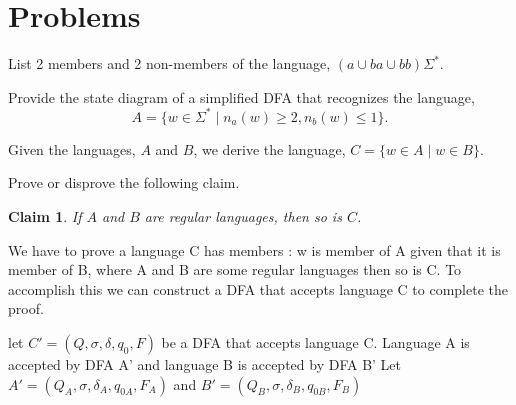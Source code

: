 \documentclass[addpoints]{exam}
\theoremstyle{claim}
\newtheorem{claim}{Claim}
\begin{document}
\section*{Problems}
\begin{questions}

\question[15] List 2 members and 2 non-members of the language, $(a \cup ba \cup bb)\Sigma^*$.
  \begin{solution}

  \end{solution}
\question[20] Provide the state diagram of a simplified DFA that recognizes the language, 
  \[
    A=\{w\in\Sigma^* \mid n_a(w) \ge 2, n_b(w) \le 1\}.
  \]
  \begin{solution} 

  \end{solution}

  
\question[30] Given the languages, $A$ and $B$, we derive the language, $C = \{ w\in A \mid w \in B \}$.

  Prove or disprove the following claim.
  \begin{claim}
    If $A$ and $B$ are regular languages, then so is $C$.
  \end{claim}
  
  \begin{solution}
    We have to prove a language C has members : w is member of A given that it is member of B, where A and B are some regular languages then so is C. To accomplish this we can construct a DFA that accepts language C to complete the proof. 

    let $C' = (Q, \sigma, \delta, q_0, F)$ be a DFA that accepts language C. 
    Language A is accepted by DFA A' and language B is accepted by DFA B'
    Let $A' = (Q_A, \sigma, \delta_A, q_{0A}, F_A)$ and $B' = (Q_B, \sigma, \delta_B, q_{0B}, F_B)$


\end{solution}
\end{questions}
\end{document}
